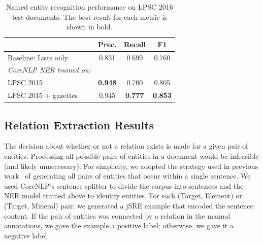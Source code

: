\documentclass[letterpaper]{article} %
\begin{document}
\begin{table}
\caption{Named entity recognition performance on LPSC 2016 test documents.  
The best result for each metric is shown in bold.}
\label{tab:ner}
\begin{center}
\begin{tabular}{l|ccc}
 & Prec. & Recall & F1 \\ \hline
Baseline: Lists only & 0.831 & 0.699 & 0.760 \\ \hline  %
{\em CoreNLP NER trained on:} & & \\
LPSC 2015            & {\bf 0.948} & 0.700 & 0.805 \\
LPSC 2015 + gazettes & 0.945 & {\bf 0.777} & {\bf 0.853} \\
\hline
\end{tabular}
\end{center}
\end{table}



\subsection{Relation Extraction Results}

The decision about whether or not a relation exists is made for a
given pair of entities.  Processing all possible pairs of entities in
a document would be infeasible (and likely unnecessary).  For
simplicity, we adopted the strategy used in previous
work~\cite{giuliano:jsre06} of generating all pairs of entities that
occur within a single sentence.  We used CoreNLP's sentence splitter
to divide the corpus into sentences and the NER model trained above to
identify entities.  For each (Target, Element) or (Target, Mineral)
pair, we generated a jSRE example that encoded the sentence content.
If the pair of entities was connected by a relation in the manual
annotations, we gave the example a positive label; otherwise, we gave
it a negative label.
\end{document}
